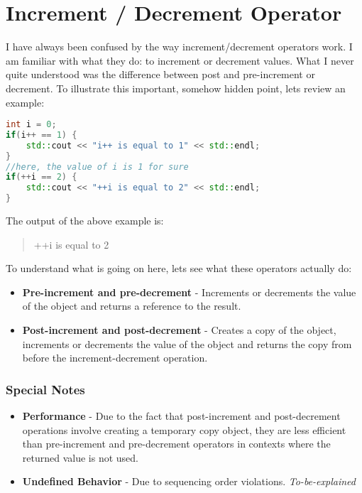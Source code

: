 \chapter{Increment / Decrement Operator}

I have always been confused by the way increment/decrement operators work. I am familiar with what they do: to increment or decrement values. What I never quite understood was the difference between post and pre-increment or decrement.
To illustrate this important, somehow hidden point, lets review an example:

\begin{lstlisting}[language=C++]
int i = 0;
if(i++ == 1) {
	std::cout << "i++ is equal to 1" << std::endl;
}
//here, the value of i is 1 for sure
if(++i == 2) {
	std::cout << "++i is equal to 2" << std::endl;
}
\end{lstlisting}

The output of the above example is:
\begin{quote}
++i is equal to 2
\end{quote}

To understand what is going on here, lets see what these operators actually do:
\begin{itemize}
\item \textbf{Pre-increment and pre-decrement} - Increments or decrements the value of the object and returns a reference to the result.
\item \textbf{Post-increment and post-decrement} - Creates a copy of the object, increments or decrements the value of the object and returns the copy from before the increment-decrement operation.
\end{itemize}

\subsection{Special Notes}
\begin{itemize}
\item \textbf{Performance} - Due to the fact that post-increment and post-decrement operations involve creating a temporary copy object, they are less efficient than pre-increment and pre-decrement operators in contexts where the returned value is not used.
\item \textbf{Undefined Behavior} - Due to sequencing order violations. \emph{To-be-explained}
\end{itemize}
